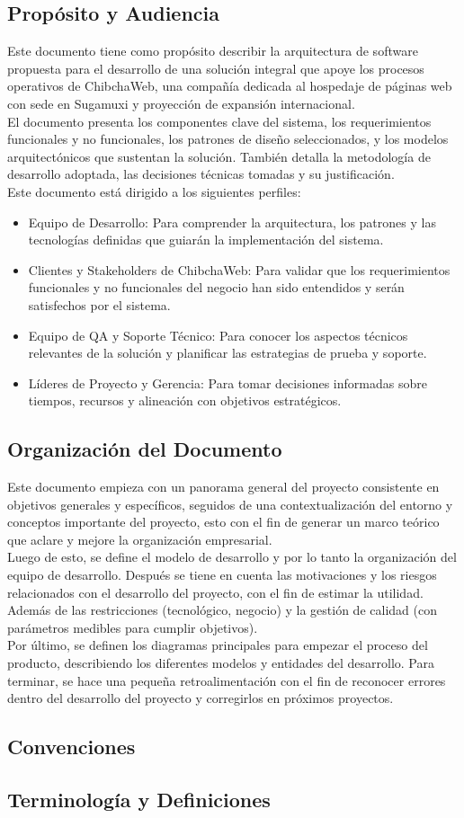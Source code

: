 \subsection{Propósito y Audiencia}
Este documento tiene como propósito describir la arquitectura de software propuesta para el desarrollo de una solución integral que apoye los procesos operativos de ChibchaWeb, una compañía dedicada al hospedaje de páginas web con sede en Sugamuxi y proyección de expansión internacional.\\
El documento presenta los componentes clave del sistema, los requerimientos funcionales y no funcionales, los patrones de diseño seleccionados, y los modelos arquitectónicos que sustentan la solución. También detalla la metodología de desarrollo adoptada, las decisiones técnicas tomadas y su justificación.\\
Este documento está dirigido a los siguientes perfiles:

\begin{itemize}
    \item{Equipo de Desarrollo: Para comprender la arquitectura, los patrones y las tecnologías definidas que guiarán la implementación del sistema.}
    \item{Clientes y Stakeholders de ChibchaWeb: Para validar que los requerimientos funcionales y no funcionales del negocio han sido entendidos y serán satisfechos por el sistema.}
    \item{Equipo de QA y Soporte Técnico: Para conocer los aspectos técnicos relevantes de la solución y planificar las estrategias de prueba y soporte.}
    \item{Líderes de Proyecto y Gerencia: Para tomar decisiones informadas sobre tiempos, recursos y alineación con objetivos estratégicos.}
\end{itemize}

\subsection{Organización del Documento}
Este documento empieza con un panorama general del proyecto consistente en objetivos generales y específicos, seguidos de una contextualización del entorno y conceptos importante del proyecto, esto con el fin de generar un marco teórico que aclare y mejore la organización empresarial.\\
Luego de esto, se define el modelo de desarrollo y por lo tanto la organización del equipo de desarrollo. Después se tiene en cuenta las motivaciones y los riesgos relacionados con el desarrollo del proyecto, con el fin de estimar la utilidad. Además de las restricciones (tecnológico, negocio) y la gestión de calidad (con parámetros medibles para cumplir objetivos).\\
Por último, se definen los diagramas principales para empezar el proceso del producto, describiendo los diferentes modelos y entidades del desarrollo.
Para terminar, se hace una pequeña retroalimentación con el fin de reconocer errores dentro del desarrollo del proyecto y corregirlos en próximos proyectos.
\subsection{Convenciones}
\subsection{Terminología y Definiciones}
